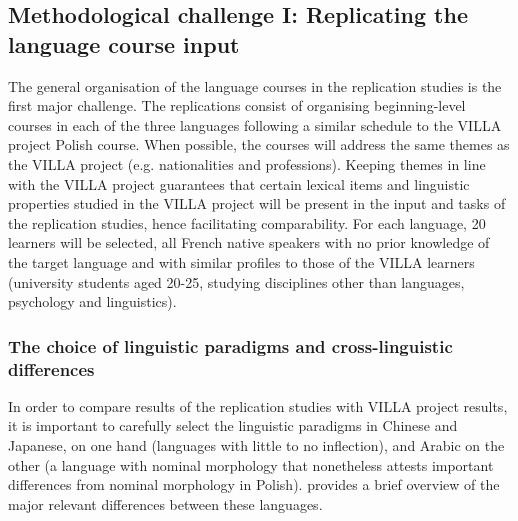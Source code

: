 \documentclass[output=paper,colorlinks,citecolor=brown,modfonts,nonflat]{../langscibook}
\begin{document}
\subsection{Methodological challenge I: Replicating the language course input}\label{sec:watorek:4.1}

The general organisation of the language courses in the replication studies is the first major challenge. The replications consist of organising beginning-level courses in each of the three languages following a similar schedule to the VILLA project Polish course. When possible, the courses will address the same themes as the VILLA project (e.g. nationalities and professions). Keeping themes in line with the VILLA project guarantees that certain lexical items and linguistic properties studied in the VILLA project will be present in the input and tasks of the replication studies, hence facilitating comparability. For each language, 20 learners will be selected, all French native speakers with no prior knowledge of the target language and with similar profiles to those of the VILLA learners (university students aged 20-25, studying disciplines other than languages, psychology and linguistics).

\subsubsection{The choice of linguistic paradigms and cross-linguistic differences}\label{sec:watorek:4.1.1}

In order to compare results of the replication studies with VILLA project results, it is important to carefully select the linguistic paradigms in Chinese and Japanese, on one hand (languages with little to no inflection), and Arabic on the other (a language with nominal morphology that nonetheless attests important differences from nominal morphology in Polish).  provides a brief overview of the major relevant differences between these languages.
\end{document}
